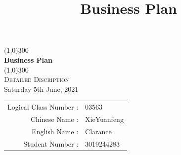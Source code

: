 \documentclass[12pt]{extarticle}
\title{Business Plan}
\numberwithin{figure}{section}
\begin{document}
\begin{titlepage}
    \begin{center}
        \line(1,0){300}\\
        [0.65cm]
        \Huge{\bfseries Business Plan }\\
        \line(1,0){300}\\
        \textsc{\LARGE Detailed Discription}\\
        [0.5cm]
        \Large{Saturday 5th June, 2021}\\
        [5.5cm]
        \begin{tabular}{rl}
            Logical Class Number : & 03563       \\
            Chinese Name         : & XieYuanfeng \\
            English Name         : & Clarance    \\
            Student Number       : & 3019244283
        \end{tabular}
    \end{center}
\end{titlepage}
\end{document}
